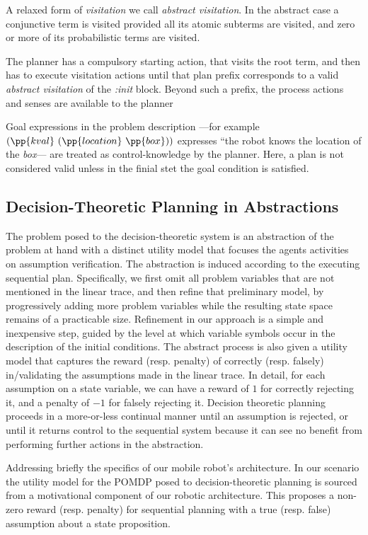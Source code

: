 \documentclass[letterpaper]{article}
\begin{document}
A relaxed form of {\em visitation} we call {\em abstract
  visitation}. In the abstract case a conjunctive term is visited
  provided all its atomic subterms are visited, and zero or more of
  its probabilistic terms are visited.

The planner has a compulsory starting action, that visits the root
term, and then has to execute visitation actions until that plan
prefix corresponds to a valid {\em abstract visitation} of the {\em
:init} block. Beyond such a prefix, the process actions and senses are
available to the planner 



Goal expressions in the problem description ---for example
$(\pp{kval}~(\pp{location}~\pp{box}))$ expresses ``the robot knows the
location of the {\em box}--- are treated as control-knowledge by the
planner. Here, a plan is not considered valid unless in the finial
stet the goal condition is satisfied.

\subsection{Decision-Theoretic Planning in Abstractions}

The problem posed to the decision-theoretic system is an abstraction
of the problem at hand with a distinct utility model that focuses the
agents activities on assumption verification. The abstraction is
induced according to the executing sequential plan. Specifically, we
first omit all problem variables that are not mentioned in the linear
trace, and then refine that preliminary model, by progressively adding
more problem variables while the resulting state space remains of a
practicable size. Refinement in our approach is a simple and
inexpensive step, guided by the level at which variable symbols occur
in the description of the initial conditions. The abstract process is
also given a utility model that captures the reward (resp. penalty) of
correctly (resp. falsely) in/validating the assumptions made in the
linear trace. In detail, for each assumption on a state variable, we
can have a reward of $1$ for correctly rejecting it, and a penalty of
$-1$ for falsely rejecting it. Decision theoretic planning proceeds in
a more-or-less continual manner until an assumption is rejected, or
until it returns control to the sequential system because it can see
no benefit from performing further actions in the abstraction.



Addressing briefly the specifics of our mobile robot's
architecture. In our scenario the utility model for the POMDP posed to
decision-theoretic planning is sourced from a motivational component
of our robotic architecture. This proposes a non-zero reward
(resp. penalty) for sequential planning with a true (resp. false)
assumption about a state proposition.
\end{document}
